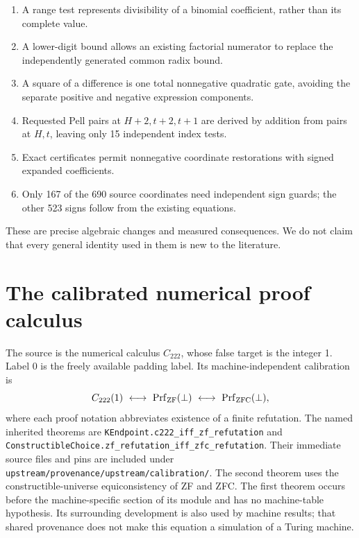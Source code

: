 \documentclass[10pt,letterpaper]{article}
\theoremstyle{definition}\newtheorem{definition}[theorem]{Definition}
\theoremstyle{remark}\newtheorem{remark}[theorem]{Remark}
\newcommand{\ZFC}{\mathrm{ZFC}}\newcommand{\ZF}{\mathrm{ZF}}
\newcommand{\file}[1]{\texttt{\nolinkurl{#1}}}
\begin{document}
\begin{enumerate}
\item A range test represents divisibility of a binomial coefficient,
      rather than its complete value.
\item A lower-digit bound allows an existing factorial numerator to
      replace the independently generated common radix bound.
\item A square of a difference is one total nonnegative quadratic gate,
      avoiding the separate positive and negative expression components.
\item Requested Pell pairs at $H+2,t+2,t+1$ are derived by addition
      from pairs at $H,t$, leaving only 15 independent index tests.
\item Exact certificates permit nonnegative coordinate restorations
      with signed expanded coefficients.
\item Only 167 of the 690 source coordinates need independent sign
      guards; the other 523 signs follow from the existing equations.
\end{enumerate}
These are precise algebraic changes and measured consequences. We do not
claim that every general identity used in them is new to the literature.

\section{The calibrated numerical proof calculus}
\label{sec:calculus}

The source is the numerical calculus $C_{222}$, whose false target is
the integer 1. Label 0 is the freely available padding label. Its
machine-independent calibration is
\begin{equation}\label{eq:calibration}
 C_{222}(1)\ \longleftrightarrow\ \Prf_{\ZF}(\bot)
       \ \longleftrightarrow\ \Prf_{\ZFC}(\bot),
\end{equation}
where each proof notation abbreviates existence of a finite refutation.
The named inherited theorems are
\file{KEndpoint.c222_iff_zf_refutation} and
\file{ConstructibleChoice.zf_refutation_iff_zfc_refutation}.
Their immediate source files and pins are included under
\file{upstream/provenance/upstream/calibration/}. The second theorem uses
the constructible-universe equiconsistency of ZF and ZFC. The first
theorem occurs before the machine-specific section of its module and has
no machine-table hypothesis. Its surrounding development is also used by
machine results; that shared provenance does not make this equation a
simulation of a Turing machine.
\end{document}
